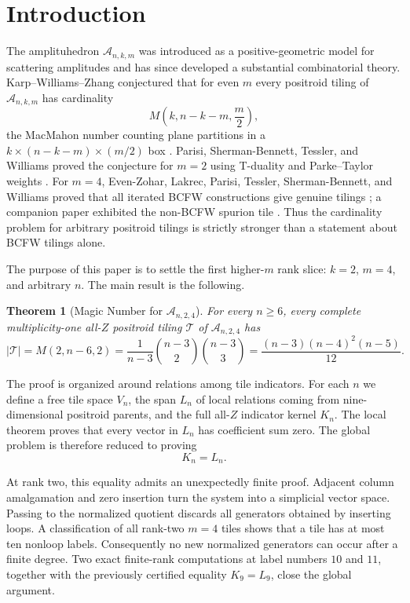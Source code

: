\documentclass[11pt]{article}
\newtheorem{theorem}{Theorem}[section]
\newcommand{\A}{\mathcal A}
\newcommand{\1}{\mathbf 1}
\begin{document}
\section{Introduction}

The amplituhedron $\A_{n,k,m}$ was introduced as a positive-geometric model
for scattering amplitudes and has since developed a substantial
combinatorial theory.  Karp--Williams--Zhang conjectured that for even $m$
every positroid tiling of $\A_{n,k,m}$ has cardinality
\[
M\!\left(k,n-k-m,\frac m2\right),
\]
the MacMahon number counting plane partitions in a
$k\times(n-k-m)\times(m/2)$ box \cite{KWZ}.  Parisi,
Sherman-Bennett, Tessler, and Williams proved the conjecture for $m=2$
using T-duality and Parke--Taylor weights \cite{M2Magic}.  For $m=4$,
Even-Zohar, Lakrec, Parisi, Tessler, Sherman-Bennett, and Williams proved
that all iterated BCFW constructions give genuine tilings
\cite{BCFWCluster}; a companion paper exhibited the non-BCFW spurion tile
\cite{ClusterResults}.  Thus the cardinality problem for arbitrary
positroid tilings is strictly stronger than a statement about BCFW
tilings alone.

The purpose of this paper is to settle the first higher-$m$ rank slice:
$k=2$, $m=4$, and arbitrary $n$.  The main result is the following.

\begin{theorem}[Magic Number for $\A_{n,2,4}$]\label{thm:main}
For every $n\ge 6$, every complete multiplicity-one all-$Z$ positroid
tiling $\mathcal T$ of $\A_{n,2,4}$ has
\[
|\mathcal T|
=M(2,n-6,2)
=\frac{1}{n-3}\binom{n-3}{2}\binom{n-3}{3}
=\frac{(n-3)(n-4)^2(n-5)}{12}.
\]
\end{theorem}

The proof is organized around relations among tile indicators.  For each
$n$ we define a free tile space $V_n$, the span $L_n$ of local relations
coming from nine-dimensional positroid parents, and the full all-$Z$
indicator kernel $K_n$.  The local theorem proves that every vector in
$L_n$ has coefficient sum zero.  The global problem is therefore reduced
to proving
\[
K_n=L_n.
\]

At rank two, this equality admits an unexpectedly finite proof.  Adjacent
column amalgamation and zero insertion turn the system into a simplicial
vector space.  Passing to the normalized quotient discards all generators
obtained by inserting loops.  A classification of all rank-two $m=4$
tiles shows that a tile has at most ten nonloop labels.  Consequently no
new normalized generators can occur after a finite degree.  Two exact
finite-rank computations at label numbers $10$ and $11$, together with the
previously certified equality $K_9=L_9$, close the global argument.
\end{document}
